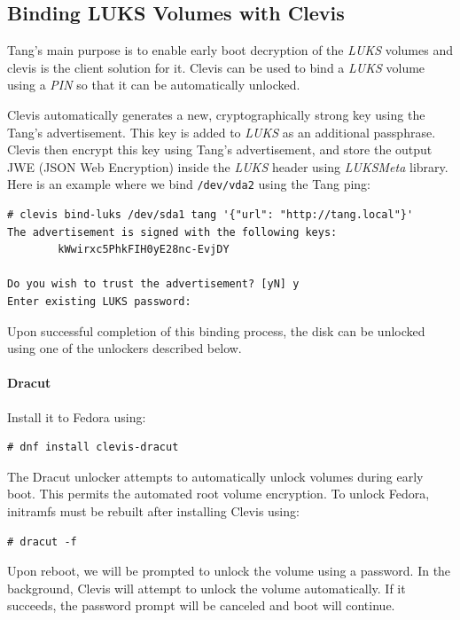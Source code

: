 \subsection{Binding LUKS Volumes with Clevis}\label{dracut}
Tang's main purpose is to enable early boot decryption of the {\it LUKS} volumes and clevis is the client solution for it.
Clevis can be used to bind a {\it LUKS} volume using a {\it PIN} so that it can be automatically unlocked.

Clevis automatically generates a new, cryptographically strong key using the Tang's advertisement.
This key is added to {\it LUKS} as an additional passphrase.
Clevis then encrypt this key using Tang's advertisement, and store the output JWE (JSON Web Encryption) inside the {\it LUKS} header using {\it LUKSMeta} library.
Here is an example where we bind {\tt /dev/vda2} using the Tang ping:
\begin{lstlisting}[columns=fixed,basicstyle=\ttfamily\footnotesize,tabsize=4,backgroundcolor=\color{yellow!10}]
# clevis bind-luks /dev/sda1 tang '{"url": "http://tang.local"}'
The advertisement is signed with the following keys:
        kWwirxc5PhkFIH0yE28nc-EvjDY

Do you wish to trust the advertisement? [yN] y
Enter existing LUKS password:
\end{lstlisting}

Upon successful completion of this binding process, the disk can be unlocked using one of the unlockers described below.



\paragraph{Dracut}\label{dracut}Install it to Fedora using:
\begin{lstlisting}[columns=fixed,basicstyle=\ttfamily\footnotesize,tabsize=4,backgroundcolor=\color{yellow!10}]
# dnf install clevis-dracut
\end{lstlisting}

The Dracut unlocker attempts to automatically unlock volumes during early boot.
This permits the automated root volume encryption.
To unlock Fedora, initramfs must be rebuilt after installing Clevis using:

\begin{lstlisting}[columns=fixed,basicstyle=\ttfamily\footnotesize,tabsize=4,backgroundcolor=\color{yellow!10}]
# dracut -f
\end{lstlisting}
Upon reboot, we will be prompted to unlock the volume using a password.
In the background, Clevis will attempt to unlock the volume automatically.
If it succeeds, the password prompt will be canceled and boot will continue.



